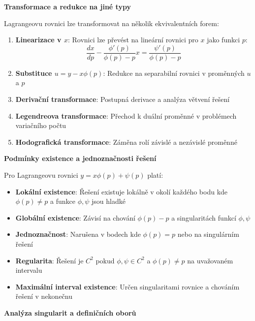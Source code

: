 \noindent\textbf{Transformace a redukce na jiné typy}

Lagrangeovu rovnici lze transformovat na několik ekvivalentních forem:

\begin{enumerate}
\item \textbf{Linearizace v $x$}: Rovnici lze převést na lineární rovnici pro $x$ jako funkci $p$:
\[
\frac{dx}{dp} - \frac{\phi'(p)}{\phi(p) - p}x = \frac{\psi'(p)}{\phi(p) - p}
\]

\item \textbf{Substituce $u = y - x\phi(p)$}: Redukce na separabilní rovnici v proměnných $u$ a $p$

\item \textbf{Derivační transformace}: Postupná derivace a analýza větvení řešení

\item \textbf{Legendreova transformace}: Přechod k duální proměnné v problémech variačního počtu

\item \textbf{Hodografická transformace}: Záměna rolí závislé a nezávislé proměnné
\end{enumerate}

\vspace{1\baselineskip}

\noindent\textbf{Podmínky existence a jednoznačnosti řešení}

Pro Lagrangeovu rovnici $y = x\phi(p) + \psi(p)$ platí:
\begin{itemize}
\item \textbf{Lokální existence}: Řešení existuje lokálně v okolí každého bodu kde $\phi(p) \neq p$ a funkce $\phi, \psi$ jsou hladké
\item \textbf{Globální existence}: Závisí na chování $\phi(p) - p$ a singularitách funkcí $\phi, \psi$
\item \textbf{Jednoznačnost}: Narušena v bodech kde $\phi(p) = p$ nebo na singulárním řešení
\item \textbf{Regularita}: Řešení je $C^2$ pokud $\phi, \psi \in C^2$ a $\phi(p) \neq p$ na uvažovaném intervalu
\item \textbf{Maximální interval existence}: Určen singularitami rovnice a chováním řešení v nekonečnu
\end{itemize}

\vspace{1\baselineskip}

\noindent\textbf{Analýza singularit a definičních oborů}

